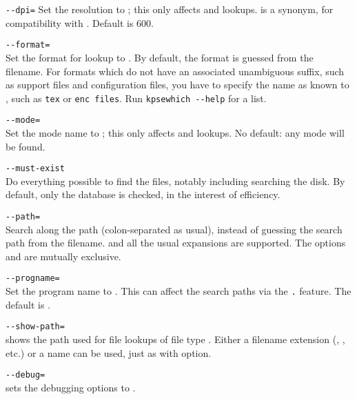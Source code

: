 \documentclass{article}
\begin{document}
\begin{ttdescription}
\item[\texttt{-{}-dpi=\var{num}}]\mbox{}
  Set the resolution to ; this only affects 
  and  lookups.   is a synonym, for compatibility
  with .  Default is 600.

\item[\texttt{-{}-format=\var{name}}]\mbox{}\\
  Set the format for lookup to .  By default, the
  format is guessed from the filename. For formats which do not have
  an associated unambiguous suffix, such as \MP{} support files and
   configuration files, you have to specify the name as
  known to \KPS{}, such as \texttt{tex} or \texttt{enc files}.  Run
  \texttt{kpsewhich -{}-help} for a list.

\item[\texttt{-{}-mode=\var{string}}]\mbox{}\\
  Set the mode name to ; this only affects 
  and  lookups.  No default: any mode will be found.
\item[\texttt{-{}-must-exist}]\mbox{}\\
  Do everything possible to find the files, notably including
  searching the disk.  By default, only the  database is
  checked, in the interest of efficiency.
\item[\texttt{-{}-path=\var{string}}]\mbox{}\\
  Search along the path  (colon-separated as usual),
  instead of guessing the search path from the filename.  \samp{//} and
  all the usual expansions are supported.  The options 
  and  are mutually exclusive.
\item[\texttt{-{}-progname=\var{name}}]\mbox{}\\
  Set the program name to \texttt{}.
  This can affect the search paths via the \texttt{.}
  feature.
  The default is .
\item[\texttt{-{}-show-path=\var{name}}]\mbox{}\\
  shows the path used for file lookups of file type \texttt{}.
  Either a filename extension (, , etc.) or a
  name can be used, just as with  option.
\item[\texttt{-{}-debug=\var{num}}]\mbox{}\\
  sets the debugging options to \texttt{}.
\end{ttdescription}
\end{document}
